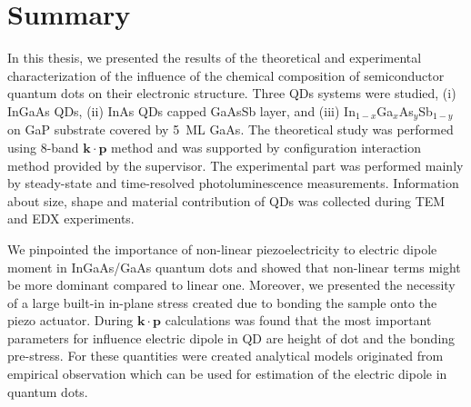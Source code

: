 
\chapter{Summary}\label{chap:summary}

In this thesis, we presented the results of the theoretical and experimental characterization of the influence of the chemical composition of semiconductor quantum dots on their electronic structure. Three QDs systems were studied, (i) InGaAs QDs, (ii) InAs QDs capped GaAsSb layer, and (iii) In$_{1-x}$Ga$_x$As$_y$Sb$_{1-y}$ on GaP substrate covered by 5~ML GaAs. The theoretical study was performed using 8-band $\mathbf{k\cdot p}$ method and was supported by configuration interaction method provided by the supervisor. The experimental part was performed mainly by steady-state and time-resolved photoluminescence measurements. Information about size, shape and material contribution of QDs was collected during TEM and EDX experiments.

We pinpointed the importance of non-linear piezoelectricity to electric dipole moment in InGaAs/GaAs quantum dots and showed that non-linear terms might be more dominant compared to linear one. Moreover, we presented the necessity of a large built-in in-plane stress created due to bonding the sample onto the piezo actuator. During $\mathbf{k\cdot p}$ calculations was found that the most important parameters for influence electric dipole in QD are height of dot and the bonding pre-stress. For these quantities were created analytical models originated from empirical observation which can be used for estimation of the electric dipole in quantum dots.
\newpage

\newpage 
